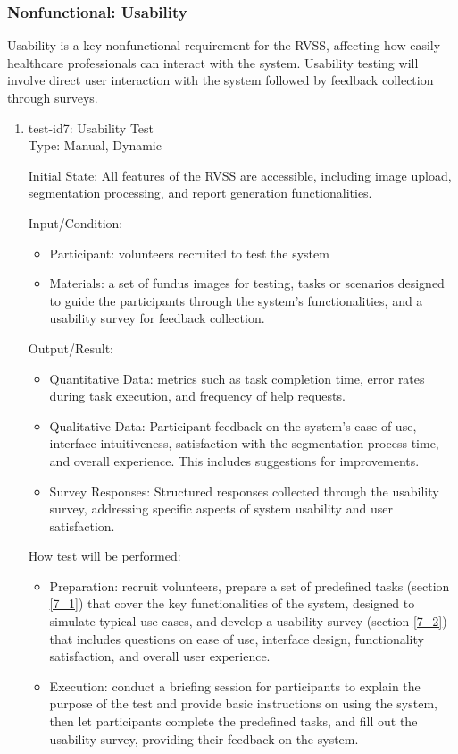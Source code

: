 \documentclass[12pt, titlepage]{article}
\begin{document}
\subsubsection{Nonfunctional: Usability}
\label{non_functional_usability}	
Usability is a key nonfunctional requirement for the RVSS, affecting how easily healthcare professionals can interact with the system. Usability testing will involve direct user interaction with the system followed by feedback collection through surveys. 

\begin{enumerate}
					
\item{test-id7: Usability Test\\}
\label{test-id-7}
Type: Manual, Dynamic
					
Initial State: All features of the RVSS are accessible, including image upload, segmentation processing, and report generation functionalities. 
					
Input/Condition: 
\begin{itemize}
    \item Participant: volunteers recruited to test the system
    \item Materials: a set of fundus images for testing, tasks or scenarios designed to guide the participants through the system's functionalities, and a usability survey for feedback collection.
\end{itemize}
					
Output/Result: 
\begin{itemize}
    \item Quantitative Data: metrics such as task completion time, error rates during task execution, and frequency of help requests.
    \item Qualitative Data: Participant feedback on the system's ease of use, interface intuitiveness, satisfaction with the segmentation process time, and overall experience. This includes suggestions for improvements.
    \item Survey Responses: Structured responses collected through the usability survey, addressing specific aspects of system usability and user satisfaction.
\end{itemize}

How test will be performed: 
\begin{itemize}
    \item Preparation: recruit volunteers, prepare a set of predefined tasks (section \ref{7_1}) that cover the key functionalities of the system, designed to simulate typical use cases, and develop a usability survey (section \ref{7_2}) that includes questions on ease of use, interface design, functionality satisfaction, and overall user experience.
    \item Execution: conduct a briefing session for participants to explain the purpose of the test and provide basic instructions on using the system, then let  participants complete the predefined tasks, and fill out the usability survey, providing their feedback on the system.
\end{itemize}

\end{enumerate}
\end{document}
